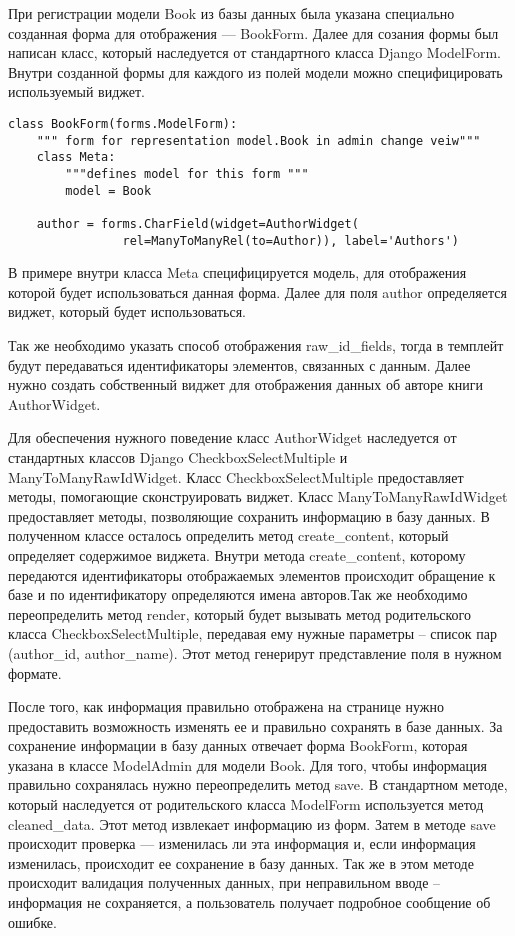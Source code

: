 При регистрации модели Book из базы данных была указана специально созданная форма для отображения --- BookForm. Далее для созания формы был написан класс, который наследуется от стандартного класса Django ModelForm. Внутри созданной формы для каждого из полей модели можно специфицировать используемый виджет.

{
\small \begin{verbatim}
class BookForm(forms.ModelForm):
    """ form for representation model.Book in admin change veiw"""
    class Meta:
        """defines model for this form """
        model = Book

    author = forms.CharField(widget=AuthorWidget(
                rel=ManyToManyRel(to=Author)), label='Authors')
\end{verbatim}
}

В примере внутри класса Meta специфицируется модель, для отображения которой будет использоваться данная форма. Далее для поля author определяется виджет, который будет использоваться. 

Так же необходимо указать способ отображения raw\_id\_fields, тогда в темплейт будут передаваться идентификаторы элементов, связанных с данным. Далее нужно создать собственный виджет для отображения данных об авторе книги AuthorWidget. 

Для обеспечения нужного поведение класс AuthorWidget наследуется от стандартных классов Django CheckboxSelectMultiple и ManyToManyRawIdWidget. Класс CheckboxSelectMultiple предоставляет методы, помогающие сконструировать виджет. Класс ManyToManyRawIdWidget предоставляет методы, позволяющие сохранить информацию в базу данных. В полученном классе осталось определить метод create\_content, который определяет содержимое виджета. Внутри метода create\_content, которому передаются идентификаторы отображаемых элементов происходит обращение к базе и по идентификатору определяются имена авторов.Так же необходимо переопределить метод render, который будет вызывать метод родительского класса CheckboxSelectMultiple, передавая ему нужные параметры -- список пар (author\_id, author\_name). Этот метод генерирут представление поля в нужном формате.

После того, как информация правильно отображена на странице нужно предоставить возможность изменять ее и правильно сохранять в базе данных. За сохранение  информации в базу данных отвечает форма BookForm, которая указана в классе ModelAdmin для модели Book. Для того, чтобы информация правильно сохранялась нужно переопределить метод save. В стандартном методе, который наследуется от родительского класса ModelForm используется метод cleaned\_data. Этот метод извлекает информацию из форм. Затем в методе save происходит проверка --- изменилась ли эта информация и, если информация изменилась, происходит ее сохранение в базу данных. Так же в этом методе происходит валидация полученных данных, при неправильном вводе -- информация не сохраняется, а пользователь получает подробное сообщение об ошибке. 

